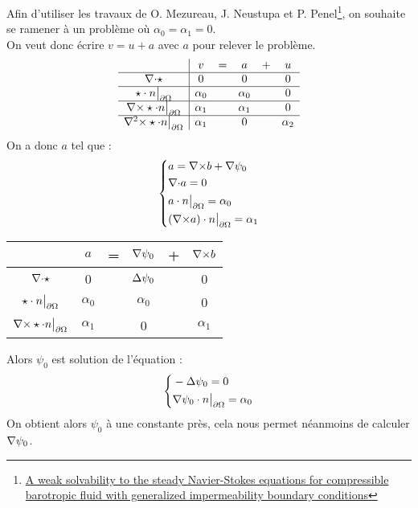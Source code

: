 Afin d'utiliser les travaux de O. Mezureau, J. Neustupa et P. Penel\footnote{\href{http://www.researchgate.net/publication/254219219\_A\_weak\_solvability\_to\_the\_steady\_NavierStokes\_equations\_for\_compressible\_barotropic\_fluid\_with\_generalized\_impermeability\_boundary\_conditions}{A weak solvability to the steady Navier-Stokes equations for compressible barotropic fluid with generalized impermeability boundary conditions}}, on souhaite se ramener à un problème où $\alpha_0=\alpha_1=0$.\\
On veut donc écrire $v=u+a$ avec $a$ pour relever le problème.
\begin{eqnarray}
\label{v}
\begin{array}{c|ccccc}
& v & = & a & + & u\\ \hline
{\nabla\cdot}\star & 0 & & 0 & & 0\\ \hline
\star\cdot n{\big\rvert_{\partial\Omega}} & \alpha_0 & & \alpha_0 & & 0\\ \hline
{\nabla\times}\star\cdot n{\big\rvert_{\partial\Omega}} & \alpha_1 & & \alpha_1 & & 0\\ \hline
{\nabla^2\times}\star\cdot n{\big\rvert_{\partial\Omega}} & \alpha_1 & & 0 & & \alpha_2
\end{array}
\end{eqnarray}
On a donc $a$ tel que :
\begin{eqnarray}
\label{aegal}
\left\{
\begin{aligned}
&a={\nabla\times} b+{\nabla}\psi_0\\
&{\nabla\cdot} a =0\\
&a\cdot n{\big\rvert_{\partial\Omega}} = \alpha_0\\
&({\nabla\times} a)\cdot n{\big\rvert_{\partial\Omega}} = \alpha_1
\end{aligned}
\right.
\end{eqnarray}
\begin{center}
\begin{tabular}{c|ccccc}
& $a$ & = & ${\nabla}\psi_0$ & + & ${\nabla\times} b$ \\ \hline
${\nabla\cdot}\star$ & 0 & & ${\Delta}\psi_0$ & & 0\\ \hline
$\star\cdot n{\big\rvert_{\partial\Omega}}$ & $\alpha_0$ & & $\alpha_0$ & & 0\\ \hline
${\nabla\times}\star\cdot n{\big\rvert_{\partial\Omega}}$ & $\alpha_1$ & & 0 & & $\alpha_1$
\end{tabular}
\end{center}
Alors $\psi_0$ est solution de l'équation :
\begin{eqnarray}
\label{psi0}
\left\{
\begin{aligned}
&-{\Delta}\psi_0 = 0\\
&{\nabla}\psi_0\cdot n{\big\rvert_{\partial\Omega}}=\alpha_0
\end{aligned}
\right.
\end{eqnarray}
On obtient alors $\psi_0$ à une constante près, cela nous permet néanmoins de
calculer ${\nabla}\psi_0$.

